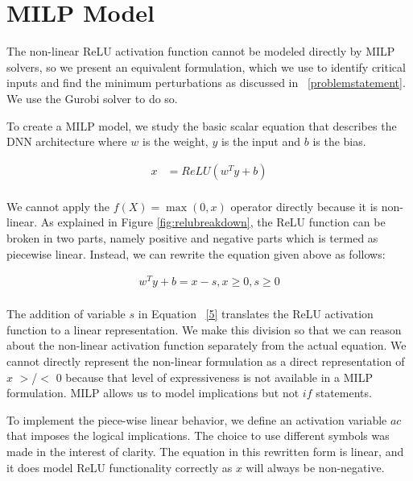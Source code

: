 \section{MILP Model}
The non-linear ReLU activation function cannot be modeled directly by MILP solvers, so we present an equivalent formulation, which we use to identify critical inputs and find the minimum perturbations as discussed in ~\ref{problemstatement}. 
We use the Gurobi solver to do so. 

 To create a \ac{MILP} model, we study the basic scalar equation that describes the \ac{DNN} architecture where $w$ is the weight, $y$ is the input and $b$ is the bias. 

\begin{equation}
\label{4}
\begin{aligned}
x &= ReLU(w^Ty + b) \\
\end{aligned}
\end{equation}
 

We cannot apply the $f(X) = \max(0, x)$ operator directly because it is non-linear. 
As explained in Figure \ref{fig:relubreakdown}, the ReLU function can be broken in two parts, namely positive and negative parts which is termed as piecewise linear. 
Instead, we can rewrite the equation given above as follows:

\begin{equation}
\label{5}
\begin{aligned}
w^Ty + b = x - s, x \geq 0, s \geq 0 \\
\end{aligned}
\end{equation}

The addition of variable $s$ in Equation ~\ref{5} translates the ReLU activation function to a linear representation.
We make this division so that we can reason about the non-linear activation function separately from the actual equation. 
We cannot directly represent the non-linear formulation as a direct representation of $x$ $>$/$<$ $0$ because that level of expressiveness is not available in a \ac{MILP}  formulation. 
\ac{MILP} allows us to model implications but not $if$ statements.



 To implement the piece-wise linear behavior, we define an activation variable $ac$ that imposes the logical implications. 
The choice to use different symbols was made in the interest of clarity. 
The equation in this rewritten form is linear, and it does model ReLU functionality  correctly  as $x$ will always be non-negative. 

